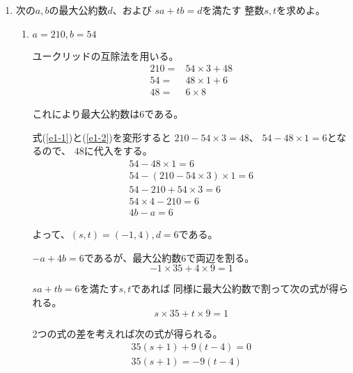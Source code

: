 \documentclass[12pt,b5paper]{ltjsarticle}
\begin{document}
\begin{enumerate}
 \item
      次の$a,b$の最大公約数$d$、および $sa+tb=d$を満たす
      整数$s,t$を求めよ。
      \begin{enumerate}
       \item
            $a=210,b=54$

            \dotfill

            ユークリッドの互除法を用いる。
            \begin{align}
             210 =& 54 \times 3 + 48\label{e1-1}\\
             54 =& 48 \times 1 + 6\label{e1-2}\\
             48 =& 6 \times 8
            \end{align}

            これにより最大公約数は$6$である。

            式(\ref{e1-1})と(\ref{e1-2})を変形すると
            $210 - 54\times 3 = 48$、
            $54 - 48\times 1 =6$となるので、
            $48$に代入をする。
            \begin{align}
             54 - 48\times 1 =6\\
             54 - (210 - 54\times 3)\times 1 =6\\
             54 - 210 + 54\times 3 =6\\
             54 \times 4 - 210 =6\\
             4b-a=6
            \end{align}

            よって、$(s,t)=(-1,4),d=6$である。

            $-a+4b=6$であるが、最大公約数$6$で両辺を割る。
            \begin{equation}
             -1\times 35 +4\times 9 =1
            \end{equation}

            $sa+tb=6$を満たす$s,t$であれば
            同様に最大公約数で割って次の式が得られる。
            \begin{equation}
             s\times 35 + t\times 9 =1
            \end{equation}

            2つの式の差を考えれば次の式が得られる。
            \begin{align}
             35(s+1)+9(t-4)=0\\
             35(s+1)=-9(t-4)\label{e1-3}
            \end{align}


\end{enumerate}
\end{enumerate}
\end{document}
